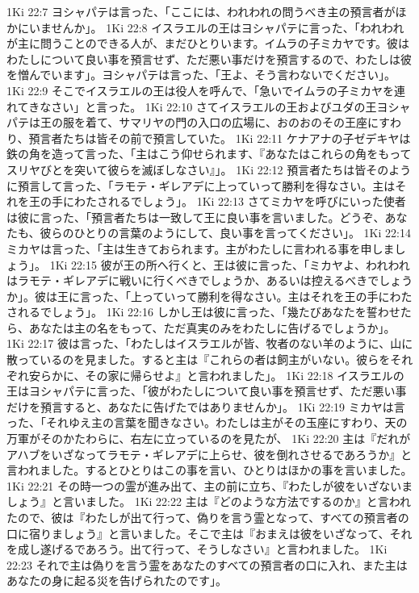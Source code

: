 1Ki 22:7  ヨシャパテは言った、「ここには、われわれの問うべき主の預言者がほかにいませんか」。
1Ki 22:8  イスラエルの王はヨシャパテに言った、「われわれが主に問うことのできる人が、まだひとりいます。イムラの子ミカヤです。彼はわたしについて良い事を預言せず、ただ悪い事だけを預言するので、わたしは彼を憎んでいます」。ヨシャパテは言った、「王よ、そう言わないでください」。
1Ki 22:9  そこでイスラエルの王は役人を呼んで、「急いでイムラの子ミカヤを連れてきなさい」と言った。
1Ki 22:10  さてイスラエルの王およびユダの王ヨシャパテは王の服を着て、サマリヤの門の入口の広場に、おのおのその王座にすわり、預言者たちは皆その前で預言していた。
1Ki 22:11  ケナアナの子ゼデキヤは鉄の角を造って言った、「主はこう仰せられます、『あなたはこれらの角をもってスリヤびとを突いて彼らを滅ぼしなさい』」。
1Ki 22:12  預言者たちは皆そのように預言して言った、「ラモテ・ギレアデに上っていって勝利を得なさい。主はそれを王の手にわたされるでしょう」。
1Ki 22:13  さてミカヤを呼びにいった使者は彼に言った、「預言者たちは一致して王に良い事を言いました。どうぞ、あなたも、彼らのひとりの言葉のようにして、良い事を言ってください」。
1Ki 22:14  ミカヤは言った、「主は生きておられます。主がわたしに言われる事を申しましょう」。
1Ki 22:15  彼が王の所へ行くと、王は彼に言った、「ミカヤよ、われわれはラモテ・ギレアデに戦いに行くべきでしょうか、あるいは控えるべきでしょうか」。彼は王に言った、「上っていって勝利を得なさい。主はそれを王の手にわたされるでしょう」。
1Ki 22:16  しかし王は彼に言った、「幾たびあなたを誓わせたら、あなたは主の名をもって、ただ真実のみをわたしに告げるでしょうか」。
1Ki 22:17  彼は言った、「わたしはイスラエルが皆、牧者のない羊のように、山に散っているのを見ました。すると主は『これらの者は飼主がいない。彼らをそれぞれ安らかに、その家に帰らせよ』と言われました」。
1Ki 22:18  イスラエルの王はヨシャパテに言った、「彼がわたしについて良い事を預言せず、ただ悪い事だけを預言すると、あなたに告げたではありませんか」。
1Ki 22:19  ミカヤは言った、「それゆえ主の言葉を聞きなさい。わたしは主がその玉座にすわり、天の万軍がそのかたわらに、右左に立っているのを見たが、
1Ki 22:20  主は『だれがアハブをいざなってラモテ・ギレアデに上らせ、彼を倒れさせるであろうか』と言われました。するとひとりはこの事を言い、ひとりはほかの事を言いました。
1Ki 22:21  その時一つの霊が進み出て、主の前に立ち、『わたしが彼をいざないましょう』と言いました。
1Ki 22:22  主は『どのような方法でするのか』と言われたので、彼は『わたしが出て行って、偽りを言う霊となって、すべての預言者の口に宿りましょう』と言いました。そこで主は『おまえは彼をいざなって、それを成し遂げるであろう。出て行って、そうしなさい』と言われました。
1Ki 22:23  それで主は偽りを言う霊をあなたのすべての預言者の口に入れ、また主はあなたの身に起る災を告げられたのです」。
